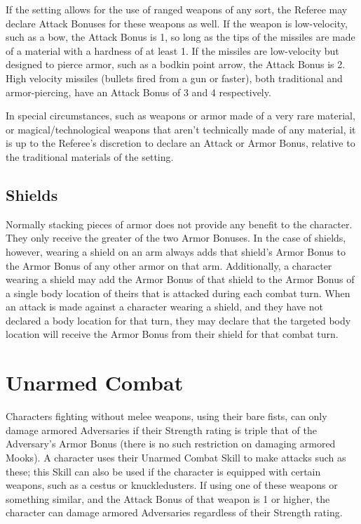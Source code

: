 \documentclass[oneside]{book}
\begin{document}
\begin{multicols}{2}
If the setting allows for the use of ranged weapons of any sort, the Referee may declare Attack Bonuses for these weapons as well. If the weapon is low-velocity, such as a bow, the Attack Bonus is 1, so long as the tips of the missiles are made of a material with a hardness of at least 1. If the missiles are low-velocity but designed to pierce armor, such as a bodkin point arrow, the Attack Bonus is 2. High velocity missiles (bullets fired from a gun or faster), both traditional and armor-piercing, have an Attack Bonus of 3 and 4 respectively. 

In special circumstances, such as weapons or armor made of a very rare material, or magical/technological weapons that aren't technically made of any material, it is up to the Referee's discretion to declare an Attack or Armor Bonus, relative to the traditional materials of the setting. 

\subsection{Shields}
Normally stacking pieces of armor does not provide any benefit to the character. They only receive the greater of the two Armor Bonuses. In the case of shields, however, wearing a shield on an arm always adds that shield's Armor Bonus to the Armor Bonus of any other armor on that arm. Additionally, a character wearing a shield may add the Armor Bonus of that shield to the Armor Bonus of a single body location of theirs that is attacked during each combat turn. When an attack is made against a character wearing a shield, and they have not declared a body location for that turn, they may declare that the targeted body location will receive the Armor Bonus from their shield for that combat turn. 

\section{Unarmed Combat}
Characters fighting without melee weapons, using their bare fists, can only damage armored Adversaries if their Strength rating is triple that of the Adversary's Armor Bonus (there is no such restriction on damaging armored Mooks). A character uses their Unarmed Combat Skill to make attacks such as these; this Skill can also be used if the character is equipped with certain weapons, such as a cestus or knuckledusters. If using one of these weapons or something similar, and the Attack Bonus of that weapon is 1 or higher, the character can damage armored Adversaries regardless of their Strength rating.  


\end{multicols}
\end{document}

